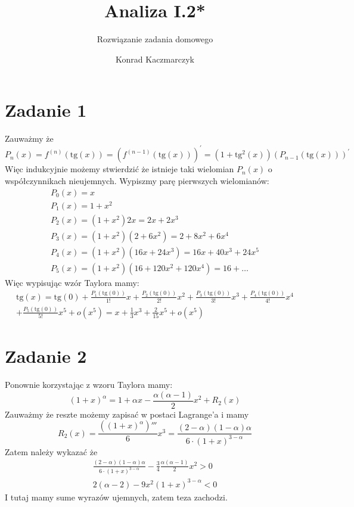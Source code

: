 \documentclass[11pt]{scrartcl}
\author{Konrad Kaczmarczyk}
\begin{document}
  \title{Analiza I.2*}
  \subtitle{Rozwiązanie zadania domowego}
  \maketitle
    \section{Zadanie 1}
        Zauważmy że
        \[
          P_n (x) = f^{(n)} (\text{tg} \left ( x \right ) ) = \left ( f^{(n-1)} (\text{tg} \left ( x \right ) ) \right )^{'} = \left ( 1 + \text{tg}^2 \left ( x \right )  \right ) \left ( P_{n-1} (\text{tg} \left ( x \right ) ) \right )^{'}
        \]
        Więc indukcyjnie możemy stwierdzić że istnieje taki wielomian $P_n(x)$ o współczynnikach nieujemnych. Wypiszmy parę pierwszych wielomianów:
        \begin{gather*}
            P_0 (x) = x \\
            P_1 (x) = 1 + x^2 \\
            P_2 (x) = (1 + x^2) 2x = 2x + 2x^3 \\
            P_3 (x) = (1+x^2)(2 + 6x^2) = 2 + 8x^2 + 6x^4 \\
            P_4 (x) = (1+x^2)(16x + 24 x^3) = 16x + 40x^3 + 24 x^5 \\
            P_5 (x) = (1+x^2)(16 + 120 x^2 + 120 x^4) = 16 + \dots 
        \end{gather*}
        Więc wypisując wzór Taylora mamy:
        \begin{gather*}
            \text{tg} \left ( x \right ) = \text{tg} \left ( 0 \right ) + \frac{P_1 (\text{tg} \left ( 0 \right ) )}{1!} x + \frac{P_2 (\text{tg} \left ( 0 \right ) )}{2!} x^2 + \frac{P_3 (\text{tg} \left ( 0 \right ) )}{3!} x^3 + \frac{P_4 (\text{tg} \left ( 0 \right ) )}{4!} x^4 \\ + \frac{P_5 (\text{tg} \left ( 0 \right ) )}{5!} x^5 + o(x^5) = x + \frac{1}{3} x^3 + \frac{2}{15} x^5 + o(x^5)
          \end{gather*}
        
       \section{Zadanie 2}
           Ponownie korzystając z wzoru Taylora mamy:
           \[
             (1+x)^{\alpha } = 1 + \alpha x - \frac{\alpha (\alpha - 1)}{2} x^2 + R_2 (x)
           \]
           Zauważmy że reszte możemy zapisać w postaci Lagrange'a i mamy 
           \[
             R_2 (x) = \frac{\left ( (1+x)^{\alpha } \right )'''}{6} x^3 = \frac{(2-\alpha )(1-\alpha )\alpha }{6 \cdot (1+x)^{3 -\alpha }}
           \]
           Zatem należy wykazać że
           \begin{gather*}
                 \frac{(2-\alpha )(1-\alpha )\alpha }{6 \cdot (1+x)^{3 -\alpha }} - \frac{3}{4} \frac{\alpha (\alpha - 1)}{2} x^2 > 0 \\
               2 \left ( \alpha - 2 \right ) - 9 x^2 (1+x)^{3-\alpha } < 0
             \end{gather*}
             I tutaj mamy sume wyrazów ujemnych, zatem teza zachodzi.
\end{document}
